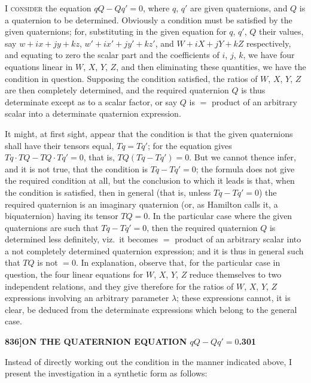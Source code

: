 \documentclass[11pt]{article}
\begin{document}
\bigskip

\noindent \textsc{I consider} the equation $qQ - Qq' = 0$, where $q$, $q'$ are given quaternions, and $Q$ is a quaternion to be determined. Obviously a condition must be satisfied by the given quaternions; for, substituting in the given equation for $q$, $q'$, $Q$ their values, say $w + ix + jy + kz$, $w' + ix' + jy' + kz'$, and $W + iX + jY + kZ$ respectively, and equating to zero the scalar part and the coefficients of $i$, $j$, $k$, we have four equations linear in $W$, $X$, $Y$, $Z$, and then eliminating these quantities, we have the condition in question. Supposing the condition satisfied, the ratios of $W$, $X$, $Y$, $Z$ are then completely determined, and the required quaternion $Q$ is thus determinate except as to a scalar factor, or say $Q$ is $=$ product of an arbitrary scalar into a determinate quaternion expression.

\medskip

It might, at first sight, appear that the condition is that the given quaternions shall have their tensors equal, $Tq = Tq'$; for the equation gives $Tq\cdot TQ - TQ\cdot Tq' = 0$, that is, $TQ(Tq - Tq') = 0$. But we cannot thence infer, and it is not true, that the condition is $Tq - Tq' = 0$; the formula does not give the required condition at all, but the conclusion to which it leads is that, when the condition is satisfied, then in general (that is, unless $Tq - Tq' = 0$) the required quaternion is an imaginary quaternion (or, as Hamilton calls it, a biquaternion) having its tensor $TQ = 0$. In the particular case where the given quaternions are such that $Tq - Tq' = 0$, then the required quaternion $Q$ is determined less definitely, viz.\ it becomes $=$ product of an arbitrary scalar into a not completely determined quaternion expression; and it is thus in general such that $TQ$ is not $= 0$. In explanation, observe that, for the particular case in question, the four linear equations for $W$, $X$, $Y$, $Z$ reduce themselves to two independent relations, and they give therefore for the ratios of $W$, $X$, $Y$, $Z$ expressions involving an arbitrary parameter $\lambda$; these expressions cannot, it is clear, be deduced from the determinate expressions which belong to the general case.

\newpage

\noindent\textbf{836]}\hfill\textbf{ON THE QUATERNION EQUATION $qQ - Qq' = 0$.}\hfill\textbf{301}

\bigskip

\noindent Instead of directly working out the condition in the manner indicated above, I present the investigation in a synthetic form as follows:
\end{document}
